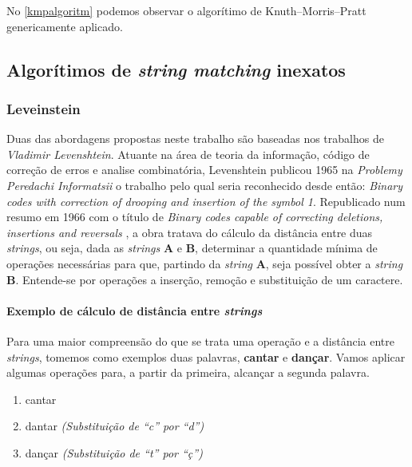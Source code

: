 No \autoref{kmpalgoritm} podemos observar o algorítimo de Knuth–Morris–Pratt genericamente aplicado.


\subsection{Algorítimos de \textit{string matching} inexatos} %

\subsubsection*{Leveinstein} %
\label{sec:leveinstein}

Duas das abordagens propostas neste trabalho são baseadas nos trabalhos de \textit{Vladimir Levenshtein}. Atuante na área de teoria da informação, código de correção de erros e analise combinatória, Levenshtein publicou 1965 na \textit{Problemy Peredachi Informatsii} o trabalho pelo qual seria reconhecido desde então: \textit{Binary codes with correction of drooping and insertion of the symbol 1}\cite{levenshtein1965}. Republicado num resumo em 1966 com o título de \textit{Binary codes capable of correcting deletions, insertions and reversals} \cite{levenshtein1966}, a obra tratava do cálculo da distância entre duas \textit{strings}, ou seja, dada as \textit{strings} \textbf{A} e \textbf{B}, determinar a quantidade mínima de operações necessárias para que, partindo da \textit{string} \textbf{A}, seja possível obter a \textit{string} \textbf{B}. Entende-se por operações a inserção, remoção e substituição de um caractere.

\paragraph*{Exemplo de cálculo de distância entre \textit{strings}} %
\label{sub:exemplo_de_c_lculo_de_distancia_entre_it}

Para uma maior compreensão do que se trata uma operação e a distância entre \textit{strings}, tomemos como exemplos duas palavras, \textbf{cantar} e \textbf{dançar}. Vamos aplicar algumas operações para, a partir da primeira, alcançar a segunda palavra.


\begin{enumerate}[start=0]
	\item cantar
	\item dantar \textit{(Substituição de ``c'' por ``d'')}
	\item dançar \textit{(Substituição de ``t'' por ``ç'')}
\end{enumerate}

